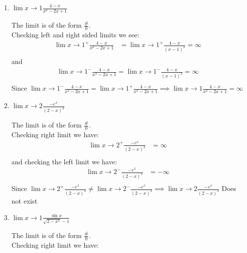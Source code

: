 \documentclass{ximera}
\begin{document}
\begin{problem}
\begin{enumerate}
    \item
      $\displaystyle \lim{x \to 1} \frac{4-x}{x^2 - 2x + 1}$
\begin{explanation}
       The limit is of the form $\frac{\#}{0}$.\\[1em]
        Checking left and right sided limits we see:
        \begin{align*}
          \displaystyle \lim{x \to 1^+} \frac{4-x}{x^2 - 2x + 1} &= \displaystyle \lim{x \to 1^+}\frac{4-x}{(x-1)^2} = \infty\\
        \end{align*}
 	 and
        \begin{align*}
 	\displaystyle \lim{x \to 1^-} \frac{4-x}{x^2 - 2x + 1} = \displaystyle \lim{x \to 1^-}\frac{4-x}{(x-1)^2} = \infty\\
	\end{align*}
	Since $\displaystyle \lim{x \to 1^-} \frac{4-x}{x^2 - 2x + 1}=\displaystyle \lim{x \to 1^+} \frac{4-x}{x^2 - 2x + 1} \implies  \displaystyle \lim{x \to 1} \frac{4-x}{x^2 - 2x + 1} = \infty$
      \end{explanation}
\item
      $\displaystyle \lim{x \to 2} \frac{-e^x}{(2-x)^3}$
\begin{explanation}
            The limit is of the form $\frac{\#}{0}$.\\[1em]
        Checking right limit we have:
 \begin{align*}
          \displaystyle \lim{x \to 2^+} \frac{-e^x}{(2-x)^3} &= \infty\\
        \end{align*}
 	 and checking the left limit we have:
        \begin{align*}
 	\displaystyle \lim{x \to 2^-} \frac{-e^x}{(2-x)^3} &= - \infty\\
	\end{align*}
	Since $ \displaystyle \lim{x \to 2^+} \frac{-e^x}{(2-x)^3} \ne \displaystyle \lim{x \to 2^-} \frac{-e^x}{(2-x)^3} \implies   \displaystyle \lim{x \to 2} \frac{-e^x}{(2-x)^3}$ Does not exist
      \end{explanation}
         \item
      $\displaystyle \lim{x \to 1} \frac{\sin{x}}{\sqrt{2-x^{2}}-1}$
\begin{explanation}
            The limit is of the form $\frac{\#}{0}$.\\[1em]
        Checking right limit we have:


\end{explanation}
\end{enumerate}
\end{problem}
\end{document}
